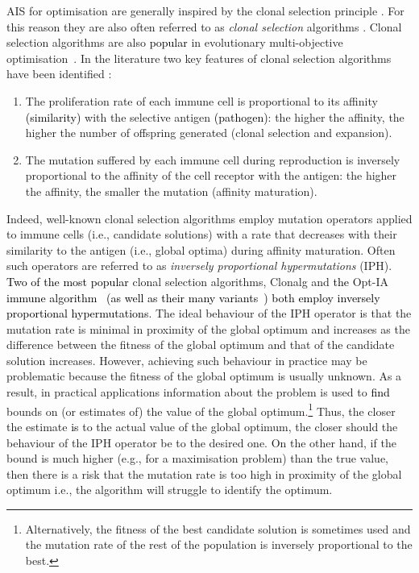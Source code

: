 \documentclass[lettersize,journal]{IEEEtran}
\newcommand{\new}[1]{\textcolor{black}{#1}}
\newcommand{\rev}[1]{\textcolor{black}{#1}}
\newcommand{\rerev}[1]{\textcolor{purple}{#1}}
\begin{document}
AIS for optimisation \cite{DeCastroTimmisBook,MO2020AAAI} are generally inspired by the clonal selection principle  \cite{Burnet1959}.
For this reason they are also often referred  to as {\it clonal selection} algorithms \cite{DeCastroTimmisBook}. 
Clonal selection algorithms are also \rev{popular} in evolutionary multi-objective optimisation~\cite{CoelloEMO2025,Coello2022,COY25,HuangZhou2020,EMOReview}. 
In the literature two key features of clonal selection algorithms have been identified \cite{Brownlee2007}: 
\begin{enumerate}
	\item  The proliferation rate of each immune cell is proportional to its affinity \new{(similarity)} with the selective antigen \new{(pathogen)}: the higher the affinity, 
	the higher the number of offspring generated (clonal selection and expansion). \item The mutation suffered by each immune cell during reproduction is inversely proportional to the affinity of the cell receptor with the antigen: the higher the affinity, 
	the smaller the mutation (affinity maturation).
\end{enumerate}
Indeed, well-known clonal selection algorithms employ mutation operators applied to immune cells (i.e., candidate solutions) with a rate that decreases with their similarity to the 
antigen (i.e., global optima) during affinity maturation. Often such operators are referred to as {\it inversely proportional hypermutations} (IPH). 
\new{Two of the most popular} clonal selection algorithms, Clonalg \cite{DecastroVonzuben2002}   and \new{the} Opt-IA \new{immune algorithm~\cite{CutelloNicosiaPavoneTimmis2007} (as well as their many variants~\cite{ClonalSelectionReview}) both employ inversely proportional hypermutations}.  
The ideal behaviour of the IPH operator is that the mutation rate is minimal in proximity of the global optimum and increases as the difference between the fitness of the global optimum
and that of the candidate solution increases. However, achieving such behaviour in practice may be problematic because the fitness of the global optimum is usually unknown.
As a result, in practical applications information about the problem is used to \new{find} bounds on (or estimates of)  the value of the global optimum\rerev{.}\footnote{Alternatively, the fitness of the best candidate solution is sometimes used and 
	the mutation rate of the rest of the population is inversely proportional to the best.}
Thus, the closer the estimate \rev{is} to the actual value of the global optimum, the closer should the behaviour of the IPH operator be to the desired one.
On the other hand,  if the bound is much higher (e.g., for a maximisation problem)  than the true value, then there is a risk that the mutation rate is too high in proximity of the global optimum 
i.e., the algorithm will struggle to identify the optimum. 
\end{document}
